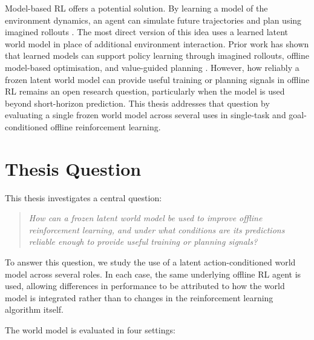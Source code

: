 Model-based RL offers a potential solution. By learning a model
of the environment dynamics, an agent can simulate future
trajectories and plan using imagined rollouts
\cite{ha2018worldmodels, hafner2020dreamer, hafner2025dreamerv4}.
The most direct version of this idea uses a learned latent world model
in place of additional environment interaction. Prior work has shown
that learned models can support policy learning through imagined
rollouts, offline model-based optimisation, and value-guided planning
\cite{ha2018worldmodels, hafner2020dreamer, yu2020mopomodelbasedofflinepolicy, hansen2022temporaldifferencelearningmodel}.
However, how reliably a frozen latent world model can provide useful
training or planning signals in offline RL remains an open research
question, particularly when the model is used beyond short-horizon
prediction. This thesis addresses that question by evaluating a single
frozen world model across several uses in single-task and
goal-conditioned offline reinforcement learning.

\section{Thesis Question}

This thesis investigates a central question:

\begin{quote}
\emph{How can a frozen latent world model be used to improve offline reinforcement learning, and under what conditions are its predictions reliable enough to provide useful training or planning signals?}
\end{quote}

To answer this question, we study the use of a latent action-conditioned world model across several roles. In each case, the same underlying offline RL agent is used, allowing differences in performance to be attributed to how the world model is integrated rather than to changes in the reinforcement learning algorithm itself.

The world model is evaluated in four settings:

